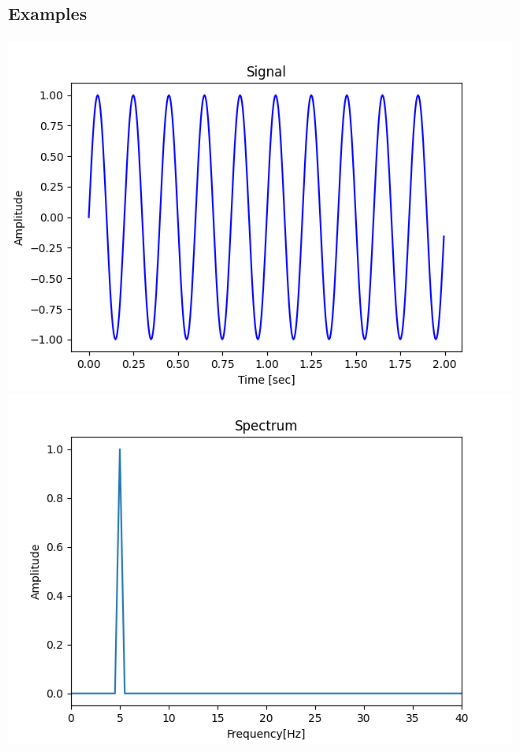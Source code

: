 \documentclass{beamer}
\begin{document}
\begin{frame}
	\frametitle{Examples}
\includegraphics[scale = 0.35]{media/signal2.png}
\includegraphics[scale = 0.35]{media/fourier2.png}	
\end{frame}
\end{document}
